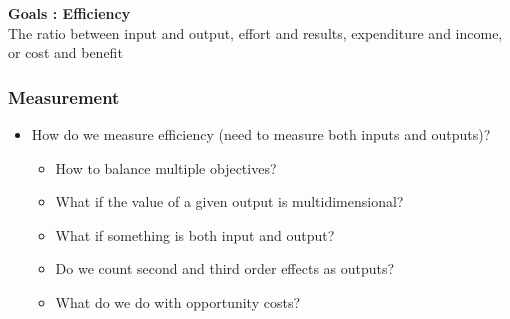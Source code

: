 \documentclass[aspectratio=169]{beamer}
\theoremstyle{principle}
\begin{document}
\begin{frame}

\begin{center}
\Huge\textbf{Goals : Efficiency}\\
\bigskip
\bigskip
\large The ratio between input and output, effort and results, expenditure and income, or cost and benefit
\end{center}

\end{frame}

\begin{frame}
\frametitle{Measurement}
\begin{itemize}
\item How do we measure efficiency (need to measure both inputs and outputs)?
\begin{itemize}
\item How to balance multiple objectives?
\item What if the value of a given output is multidimensional?
\item What if something is both input and output?
\item Do we count second and third order effects as outputs?
\item What do we do with opportunity costs?
\end{itemize}
\end{itemize}

\end{frame}
\end{document}
